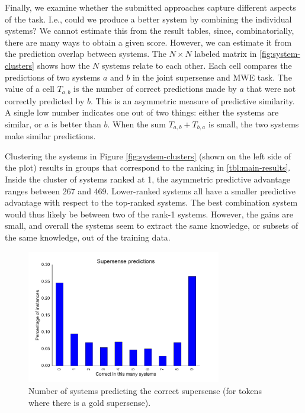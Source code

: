 \documentclass[11pt,letterpaper]{article}
\newcommand{\ensuretext}[1]{#1}
\newcommand{\ajmarker}{\ensuretext{\textcolor{purple}{\ensuremath{^{\textsc{A}}_{\textsc{J}}}}}}
\newcommand{\arkcomment}[3]{\ensuretext{\textcolor{#3}{[#1 #2]}}}
\newcommand{\aj}[1]{\arkcomment{\ajmarker}{#1}{purple}}
\begin{document}
Finally, we examine whether the submitted approaches capture different aspects of the task. 
I.e., could we produce a better system by combining the individual systems? 
We cannot estimate this from the result tables, since, combinatorially, 
there are many ways to obtain a given score. 
However, we can estimate it from the prediction overlap between systems.
The $N \times N$ labeled matrix in \cref{fig:system-clusters} 
shows how the $N$ systems relate to each other. 
Each cell compares the predictions of two systems $a$ and $b$ in the joint supersense and MWE task. 
The value of a cell $T_{a,b}$ is the number of correct predictions made by $a$ 
that were not correctly predicted by $b$. This is an asymmetric measure of predictive similarity. 
A single low number indicates one out of two things: either the systems are similar, or $a$ is better than $b$. 
When the sum $T_{a,b} + T_{b,a}$ is small, the two systems make similar predictions. 

Clustering the systems in Figure \ref{fig:system-clusters} (shown on the left side of the plot) 
results in groups that correspond to the ranking in \cref{tbl:main-results}. 
Inside the cluster of systems ranked at 1, the asymmetric predictive advantage ranges between 267 and 469. 
Lower-ranked systems all have a smaller predictive advantage with respect to the top-ranked systems. 
The best combination system would thus likely be between two of the rank-1 systems. 
However, the gains are small, and overall the systems seem to extract the same knowledge, 
or subsets of the same knowledge, out of the training data. 


\begin{figure}[ht]
		\includegraphics[width=8.5cm]{figs/supersense_predictions.pdf}
	\caption{Number of systems predicting the correct supersense (for tokens where there is a gold supersense). 
}
	\label{fig:supersense-predictions}
\end{figure}
\end{document}

